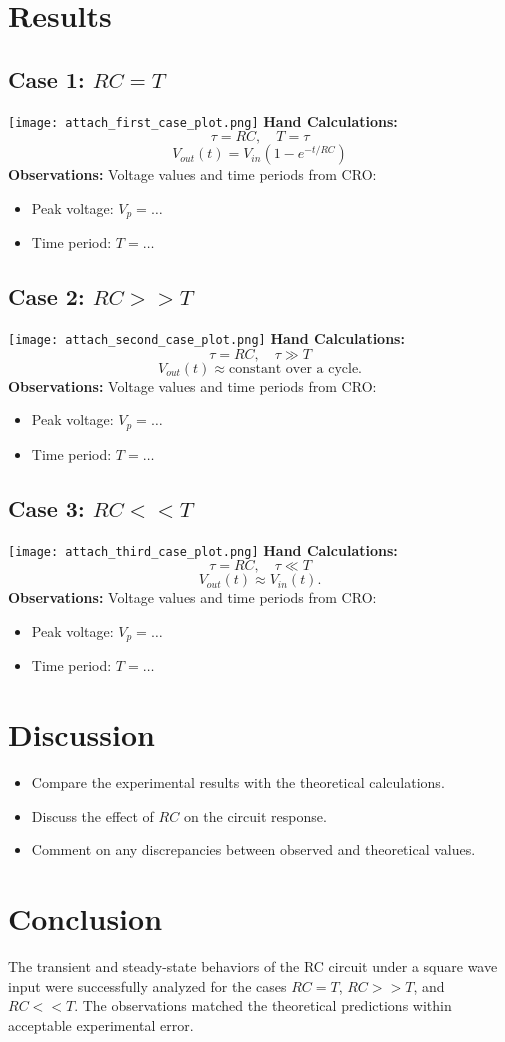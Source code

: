 \documentclass[12pt,a4paper]{article}
\begin{document}
\section*{Results}
\subsection*{Case 1: \(RC = T\)}
\texttt{[image: attach\_first\_case\_plot.png]}
\textbf{Hand Calculations:}
\[ \tau = RC, \quad T = \tau \]
\[ V_{out}(t) = V_{in}(1 - e^{-t/RC}) \]
\textbf{Observations:}
Voltage values and time periods from CRO:
\begin{itemize}
    \item Peak voltage: \(V_p = \ldots\)
    \item Time period: \(T = \ldots\)
\end{itemize}

\subsection*{Case 2: \(RC >> T\)}
\texttt{[image: attach\_second\_case\_plot.png]}
\textbf{Hand Calculations:}
\[ \tau = RC, \quad \tau \gg T \]
\[ V_{out}(t) \approx \text{constant over a cycle.} \]
\textbf{Observations:}
Voltage values and time periods from CRO:
\begin{itemize}
    \item Peak voltage: \(V_p = \ldots\)
    \item Time period: \(T = \ldots\)
\end{itemize}

\subsection*{Case 3: \(RC << T\)}
\texttt{[image: attach\_third\_case\_plot.png]}
\textbf{Hand Calculations:}
\[ \tau = RC, \quad \tau \ll T \]
\[ V_{out}(t) \approx V_{in}(t). \]
\textbf{Observations:}
Voltage values and time periods from CRO:
\begin{itemize}
    \item Peak voltage: \(V_p = \ldots\)
    \item Time period: \(T = \ldots\)
\end{itemize}

\section*{Discussion}
\begin{itemize}
    \item Compare the experimental results with the theoretical calculations.
    \item Discuss the effect of \(RC\) on the circuit response.
    \item Comment on any discrepancies between observed and theoretical values.
\end{itemize}

\section*{Conclusion}
The transient and steady-state behaviors of the RC circuit under a square wave input were successfully analyzed for the cases \(RC = T\), \(RC >> T\), and \(RC << T\). The observations matched the theoretical predictions within acceptable experimental error.
\end{document}
